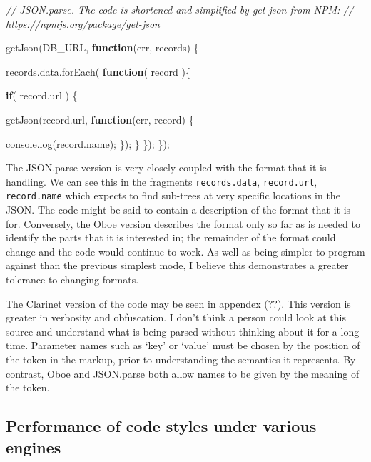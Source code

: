 \documentclass[]{article}
\newenvironment{Shaded}{}{}
\newcommand{\KeywordTok}[1]{\textcolor[rgb]{0.00,0.44,0.13}{\textbf{{#1}}}}
\newcommand{\CommentTok}[1]{\textcolor[rgb]{0.38,0.63,0.69}{\textit{{#1}}}}
\newcommand{\OtherTok}[1]{\textcolor[rgb]{0.00,0.44,0.13}{{#1}}}
\newcommand{\FunctionTok}[1]{\textcolor[rgb]{0.02,0.16,0.49}{{#1}}}
\newcommand{\NormalTok}[1]{{#1}}
\begin{document}
\begin{Shaded}
\begin{Highlighting}[]
\CommentTok{// JSON.parse. The code is shortened and simplified by get-json from NPM:}
\CommentTok{// https://npmjs.org/package/get-json}

\FunctionTok{getJson}\NormalTok{(DB_URL, }\KeywordTok{function}\NormalTok{(err, records) \{}
    
   \OtherTok{records}\NormalTok{.}\OtherTok{data}\NormalTok{.}\FunctionTok{forEach}\NormalTok{( }\KeywordTok{function}\NormalTok{( record )\{}
    
      \KeywordTok{if}\NormalTok{( }\OtherTok{record}\NormalTok{.}\FunctionTok{url} \NormalTok{) \{}
      
         \FunctionTok{getJson}\NormalTok{(}\OtherTok{record}\NormalTok{.}\FunctionTok{url}\NormalTok{, }\KeywordTok{function}\NormalTok{(err, record) \{}
         
            \OtherTok{console}\NormalTok{.}\FunctionTok{log}\NormalTok{(}\OtherTok{record}\NormalTok{.}\FunctionTok{name}\NormalTok{);}
         \NormalTok{\});}
      \NormalTok{\}}
   \NormalTok{\});}
\NormalTok{\});}
\end{Highlighting}
\end{Shaded}

The JSON.parse version is very closely coupled with the format that it
is handling. We can see this in the fragments \texttt{records.data},
\texttt{record.url}, \texttt{record.name} which expects to find
sub-trees at very specific locations in the JSON. The code might be said
to contain a description of the format that it is for. Conversely, the
Oboe version describes the format only so far as is needed to identify
the parts that it is interested in; the remainder of the format could
change and the code would continue to work. As well as being simpler to
program against than the previous simplest mode, I believe this
demonstrates a greater tolerance to changing formats.

The Clarinet version of the code may be seen in appendex (??). This
version is greater in verbosity and obfuscation. I don't think a person
could look at this source and understand what is being parsed without
thinking about it for a long time. Parameter names such as `key' or
`value' must be chosen by the position of the token in the markup, prior
to understanding the semantics it represents. By contrast, Oboe and
JSON.parse both allow names to be given by the meaning of the token.

\subsection{Performance of code styles under various engines}
\end{document}
